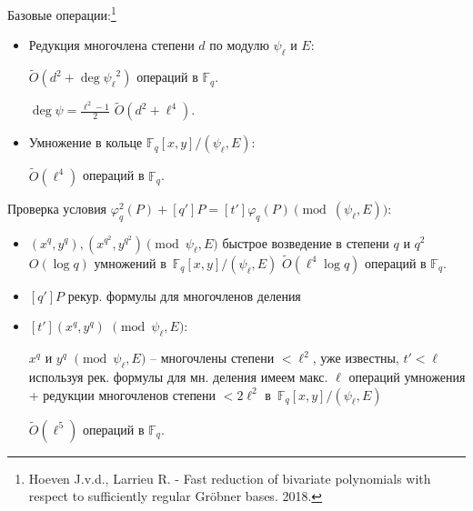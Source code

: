 \documentclass{beamer}
\begin{document}
\begin{frame}

Базовые операции:\footnote{Hoeven J.v.d., Larrieu R. - Fast reduction of bivariate polynomials with respect to sufficiently regular Gröbner bases. 2018.}
\begin{itemize}
    \item Редукция многочлена степени $d$ по модулю $\psi_\ell$ и $E$:
    
    $\widetilde{O}(d^2 + \deg{\psi_\ell}^2)$ операций в $\mathbb{F}_q$.
    
    $\deg{\psi} = \frac{\ell^2 - 1}{2}$ \MyImplies $\widetilde{O}(d^2 + \ell^4)$.
    
    \item Умножение в кольце $\mathbb{F}_q[x, y] / (\psi_\ell, E)$:
    
    $\widetilde{O}(\ell^4)$ операций в $\mathbb{F}_q$.
\end{itemize}
\end{frame}

\begin{frame}
Проверка условия $\varphi_q^2(P) + [q'] P = [t']\varphi_q(P) \pmod{(\psi_\ell, E)}$:
\begin{itemize}
    \item $(x^q, y^q), (x^{q^2}, y^{q^2}) \pmod{\psi_\ell, E} $ \MyImplies
    быстрое возведение в степени $q$ и $q^2$
    \MyImplies
    $O(\log{q})$ умножений в~$\mathbb{F}_q[x, y] / (\psi_\ell, E)$
    \MyImplies
    $\widetilde{O}(\ell^4 \log{q})$ операций в $\mathbb{F}_q$.
    
    
    \vspace{0.5em}
    \item $[q'] P$ \MyImplies рекур. формулы для многочленов деления%
    
    \vspace{0.5em}
    \item $[t'](x^q, y^q)$ $\pmod{\psi_\ell, E}$:
    
    $x^q$ и $y^q$ $\pmod{\psi_\ell, E}$ -- многочлены степени $< \ell^2$, уже известны, $t' < \ell$
    \MyImplies
    используя рек. формулы для мн. деления имеем макс. $\ell$ операций умножения + редукции многочленов степени $< 2 \ell^2$ в~$\mathbb{F}_q[x, y] / (\psi_\ell, E)$
    
    \MyImplies
    $\widetilde{O}(\ell^5)$ операций в $\mathbb{F}_q$.
\end{itemize}
\end{frame}
\end{document}
